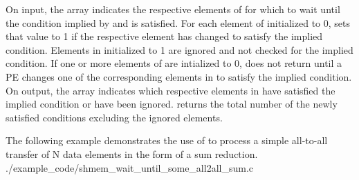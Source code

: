 \begin{apidefinition}
{    On input, the  array indicates the respective elements of
     for which to wait until the condition implied by  and
     is satisfied.  For each element of 
    initialized to 0,  sets that value to 1 if
    the respective  element has changed to satisfy the implied
    condition. Elements in  initialized to 1 are ignored and not
    checked for the implied condition.  If one or more elements of
     are intialized to 0,  does not
    return until a \ac{PE} changes one of the corresponding elements in
     to satisfy the implied condition.  On output, the 
    array indicates which respective elements in  have satisfied the
    implied condition or have been ignored.  
    returns the total number of the newly satisfied conditions excluding the
    ignored elements.
}






\begin{apiexamples}

\apicexample
{The following \CorCpp{} example demonstrates the use of 
 to process a simple all-to-all transfer of N data elements in the form of a sum reduction.}
{./example_code/shmem_wait_until_some_all2all_sum.c}
{}

\end{apiexamples}

\end{apidefinition}
